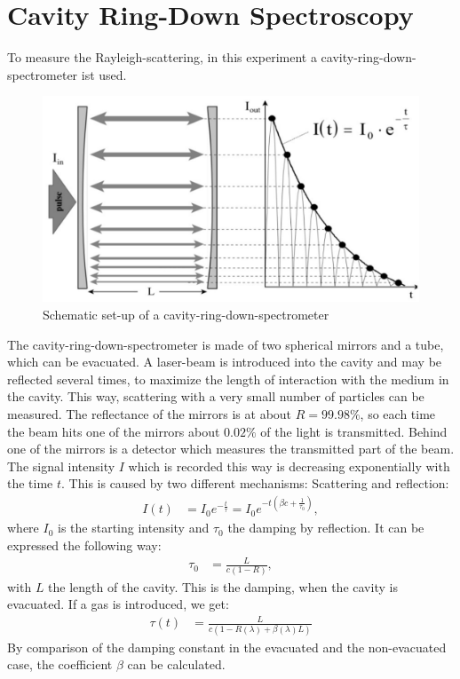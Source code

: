 \documentclass[
	parskip=half,10pt,
	numbers= noenddot, %
	toc=flat, %
	oneside,
	twocolumn,
	]{scrartcl}
\begin{document}
\section{Cavity Ring-Down Spectroscopy}

To measure the Rayleigh-scattering, in this experiment a cavity-ring-down-spectrometer ist used. 
\begin{figure}[h]
\includegraphics[width=.48 \textwidth]{images/crds.pdf}
\caption{Schematic set-up of a cavity-ring-down-spectrometer \cite{wiki}}
\label{fig:set-up}
\end{figure}
The cavity-ring-down-spectrometer is made of two spherical mirrors and a tube, which can be evacuated. A laser-beam is introduced into the cavity and may be reflected 
several times, to maximize the length of interaction with the medium in the cavity. This way, scattering with a very small number of particles can be measured. 
The reflectance of the mirrors is at about $R=99.98 \%$, so each time the beam hits one of the mirrors about $0.02\%$ of the light is 
transmitted. Behind one of the mirrors is a detector which measures the transmitted part of the beam. The signal intensity $I$ which is recorded this way is 
decreasing exponentially with the time $t$. This is caused by two different mechanisms: Scattering and reflection:
\begin{align}
I(t) &= I_0 e^{-\frac{t}{\tau}}=I_0 e^{- t \left ( \beta c + \frac{1}{\tau_0} \right )},
\label{eq:IDec}
\end{align}
where $I_0$ is the starting intensity and $\tau_0$ the damping by reflection. It can be expressed the following way:
\begin{align}
\tau_0 &= \frac{L}{c(1-R)},
\end{align}
with $L$ the length of the cavity. This is the damping, when the cavity is evacuated. If a gas is introduced, we get:
\begin{align}
\tau(t) &= \frac{L}{c(1-R(\lambda) + \beta(\lambda)L)}
\end{align}
By comparison of the damping constant in the evacuated and the non-evacuated case, the coefficient $\beta$ can be calculated. 
\end{document}
